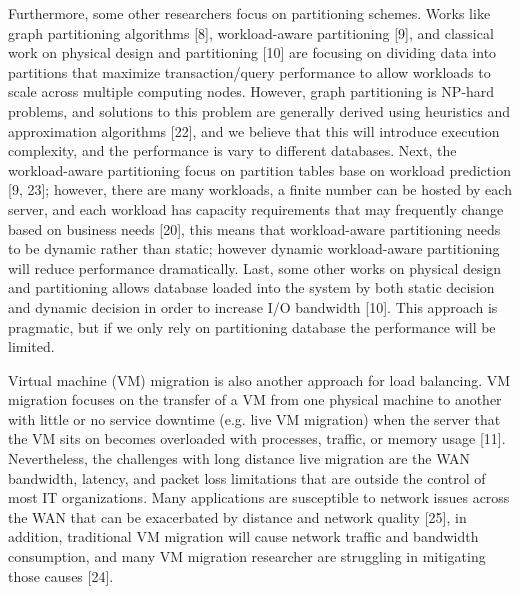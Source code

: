 Furthermore, some other researchers focus on partitioning schemes. Works like graph partitioning algorithms [8], workload-aware partitioning [9], and classical work on physical design and partitioning [10] are focusing on dividing data into partitions that maximize transaction/query performance to allow workloads to scale across multiple computing nodes. However, graph partitioning is NP-hard problems, and solutions to this problem are generally derived using heuristics and approximation algorithms [22], and we believe that this will introduce execution complexity, and the performance is vary to different databases. Next, the workload-aware partitioning focus on partition tables base on workload prediction [9, 23]; however, there are many workloads, a ﬁnite number can be hosted by each server, and each workload has capacity requirements that may frequently change based on business needs [20], this means that workload-aware partitioning needs to be dynamic rather than static; however dynamic workload-aware partitioning will reduce performance dramatically. Last, some other works on physical design and partitioning allows database loaded into the system by both static decision and dynamic decision in order to increase I/O bandwidth [10]. This approach is pragmatic, but if we only rely on partitioning database the performance will be limited.
 
Virtual machine (VM) migration is also another approach for load balancing. VM migration focuses on the transfer of a VM from one physical machine to another with little or no service downtime (e.g. live VM migration) when the server that the VM sits on becomes overloaded with processes, traffic, or memory usage [11]. Nevertheless, the challenges with long distance live migration are the WAN bandwidth, latency, and packet loss limitations that are outside the control of most IT organizations. Many applications are susceptible to network issues across the WAN that can be exacerbated by distance and network quality [25], in addition, traditional VM migration will cause network traffic and bandwidth consumption, and many VM migration researcher are struggling in mitigating those causes [24].